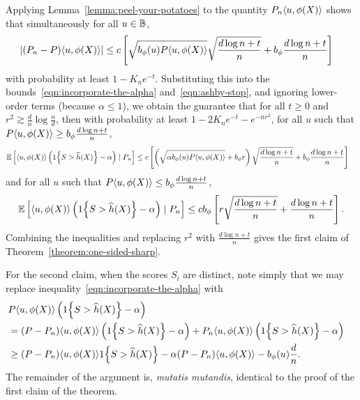 \documentclass{article}
\newcommand{\radphi}{b_{\phi}}
\newcommand{\scorerv}{S}
\begin{document}
Applying Lemma~\ref{lemma:peel-your-potatoes} to the quantity
$P_n\langle u, \phi(X)\rangle$ shows that simultaneously
for all $u \in \mathbb{B}$,
\begin{align*}
  |(P_n - P)\<u, \phi(X)\>| & \le
  c
  \left[\sqrt{\radphi(u) P\<u, \phi(X)\>}
    \sqrt{\frac{d \log n + t}{n}}
    + \radphi \frac{d \log n + t}{n}\right]
\end{align*}
with probability at least $1 - K_n e^{-t}$.
%
Substituting this into the
bounds~\eqref{eqn:incorporate-the-alpha} and~\eqref{eqn:ashby-stop}, and
ignoring lower-order terms (because $\alpha \le 1$), we obtain the guarantee
that for all $t \ge 0$ and $r^2 \gtrsim \frac{d}{n} \log \frac{n}{d}$, then
with probability at least $1 - 2 K_n e^{-t} - e^{-n r^2}$, for all $u$ such
that $P\<u, \phi(X)\> \ge \radphi \frac{d \log n + t}{n}$,
\begin{align*}
  \E\left[
    \<u, \phi(X)\> \left(\indic{\scorerv > \what{h}(X)} - \alpha\right)
    \mid P_n\right]
  & \le
  c \left[
    \left(\sqrt{\alpha \radphi(u) P\<u, \phi(X)\>} + \radphi r\right)
    \sqrt{\frac{d \log n + t}{n}}
    + \radphi \frac{d \log n + t}{n}
    \right]
\end{align*}
and for all $u$ such that $P\<u, \phi(X)\> \le \radphi
\frac{d \log n + t}{n}$,
\begin{align*}
  \E\left[
    \<u, \phi(X)\> \left(\indic{\scorerv > \what{h}(X)} - \alpha\right)
    \mid P_n\right]
  \le c \radphi \left[r \sqrt{\frac{d \log n + t}{n}}
    + \frac{d \log n + t}{n}\right].
\end{align*}
Combining the inequalities and replacing
$r^2$ with $\frac{d \log n + t}{n}$
gives the first claim of Theorem~\ref{theorem:one-sided-sharp}.

For the second claim, when the scores $\scorerv_i$ are distinct,
note simply that we may replace
inequality~\eqref{eqn:incorporate-the-alpha}
with
\begin{align*}
  \lefteqn{
    P \<u, \phi(X)\> \left(\indic{\scorerv > \what{h}(X)}
    - \alpha\right)} \nonumber \\
  & = (P - P_n)\<u, \phi(X)\> \left(\indic{\scorerv > \what{h}(X)}
  - \alpha\right)
  + P_n \<u, \phi(X)\> \left(\indic{\scorerv > \what{h}(X)}
  - \alpha\right) \nonumber \\
  & \ge (P - P_n) \<u, \phi(X)\> \indic{\scorerv > \what{h}(X)}
  - \alpha (P - P_n) \<u, \phi(X)\>
  - \radphi(u) \frac{d}{n}.
\end{align*}
The remainder of the argument is, \emph{mutatis mutandis}, identical to the
proof of the first claim of the theorem.
\end{document}
